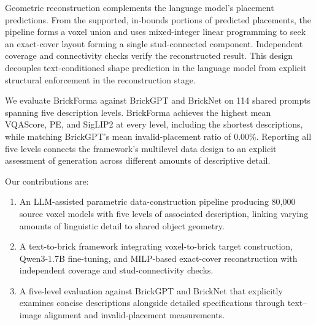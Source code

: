 Geometric reconstruction complements the language model's placement predictions. From the supported, in-bounds portions of predicted placements, the pipeline forms a voxel union and uses mixed-integer linear programming to seek an exact-cover layout forming a single stud-connected component. Independent coverage and connectivity checks verify the reconstructed result. This design decouples text-conditioned shape prediction in the language model from explicit structural enforcement in the reconstruction stage.

We evaluate BrickForma against BrickGPT and BrickNet on 114 shared prompts spanning five description levels. BrickForma achieves the highest mean VQAScore, PE, and SigLIP2 at every level, including the shortest descriptions, while matching BrickGPT's mean invalid-placement ratio of 0.00\%. Reporting all five levels connects the framework's multilevel data design to an explicit assessment of generation across different amounts of descriptive detail.

Our contributions are:
\begin{enumerate}
\item An LLM-assisted parametric data-construction pipeline producing 80,000 source voxel models with five levels of associated description, linking varying amounts of linguistic detail to shared object geometry.
\item A text-to-brick framework integrating voxel-to-brick target construction, Qwen3-1.7B fine-tuning, and MILP-based exact-cover reconstruction with independent coverage and stud-connectivity checks.
\item A five-level evaluation against BrickGPT and BrickNet that explicitly examines concise descriptions alongside detailed specifications through text--image alignment and invalid-placement measurements.
\end{enumerate}

